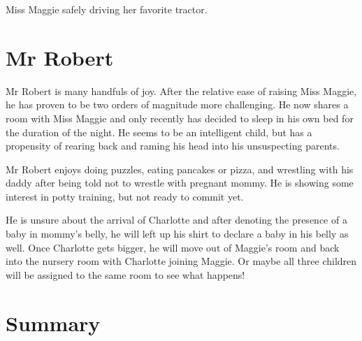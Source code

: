 \documentclass[letterpaper,11pt]{article}
\makeatletter
\newenvironment{figurehere}
  {\def\@captype{figure}}
  {}
\makeatother
\begin{document}
\begin{multicols}{2}
\bigskip

\begin{figurehere}
 \centering   
 \caption{Miss Maggie safely driving her favorite tractor.}
\end{figurehere}

\section{Mr Robert}

Mr Robert is many handfuls of joy.  After the relative ease of raising Miss
Maggie, he has proven to be two orders of magnitude more challenging.  He now
shares a room with Miss Maggie and only recently has decided to sleep in his own
bed for the duration of the night. He seems to be an intelligent child, but has
a propensity of rearing back and raming his head into his unsuspecting parents. 

Mr Robert enjoys doing puzzles, eating pancakes or pizza, and wrestling with his
daddy after being told not to wrestle with pregnant mommy.  He is showing some
interest in potty training, but not ready to commit yet.

He is unsure about the arrival of Charlotte and after denoting the presence of a
baby in mommy's belly, he will left up his shirt to declare a baby in his belly
as well.  Once Charlotte gets bigger, he will move out of Maggie's room and back
into the nursery room with Charlotte joining Maggie.  Or maybe all three
children will be assigned to the same room to see what happens!

\section{Summary}


\end{multicols}
\end{document}
